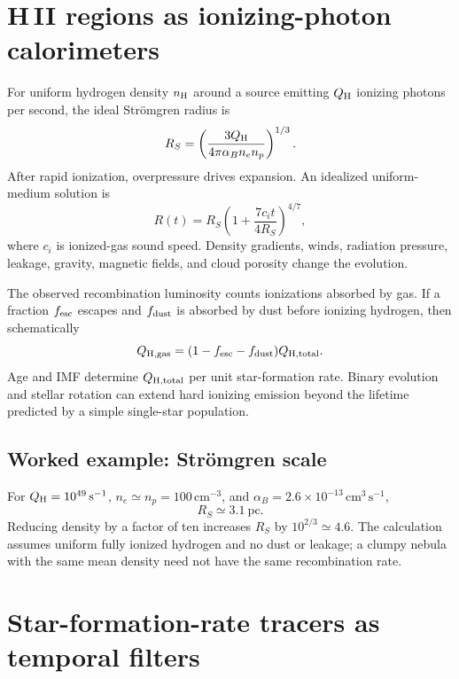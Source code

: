 \section{\texorpdfstring{H\,II}{H II} regions as ionizing-photon calorimeters}

For uniform hydrogen density $n_{\rm H}$ around a source emitting $Q_{\rm H}$ ionizing
photons per second, the ideal Str\"omgren radius is
\begin{equation}
 R_S=\left(\frac{3Q_{\rm H}}{4\pi\alpha_Bn_e n_p}\right)^{1/3}.
 \label{eq:stromgren-radius}
\end{equation}
After rapid ionization, overpressure drives expansion.  An idealized uniform-medium
solution is
\begin{equation}
 R(t)=R_S\left(1+\frac{7c_it}{4R_S}\right)^{4/7},
 \label{eq:hii-spitzer-expansion}
\end{equation}
where $c_i$ is ionized-gas sound speed.  Density gradients, winds, radiation pressure,
leakage, gravity, magnetic fields, and cloud porosity change the evolution.

The observed recombination luminosity counts ionizations absorbed by gas.  If a
fraction $f_{\rm esc}$ escapes and $f_{\rm dust}$ is absorbed by dust before ionizing
hydrogen, then schematically
\begin{equation}
 Q_{\rm H,gas}=(1-f_{\rm esc}-f_{\rm dust})Q_{\rm H,total}.
 \label{eq:ionizing-photon-budget}
\end{equation}
Age and IMF determine $Q_{\rm H,total}$ per unit star-formation rate.  Binary evolution
and stellar rotation can extend hard ionizing emission beyond the lifetime predicted
by a simple single-star population.

\subsection{Worked example: Str\"omgren scale}

For $Q_{\rm H}=10^{49}\,\mathrm{s^{-1}}$, $n_e\simeq n_p=100\,\mathrm{cm^{-3}}$,
and $\alpha_B=2.6\times10^{-13}\,\mathrm{cm^3\,s^{-1}}$,
\begin{equation}
 R_S\simeq3.1~\mathrm{pc}.
\end{equation}
Reducing density by a factor of ten increases $R_S$ by $10^{2/3}\simeq4.6$.
The calculation assumes uniform fully ionized hydrogen and no dust or leakage; a
clumpy nebula with the same mean density need not have the same recombination rate.

\section{Star-formation-rate tracers as temporal filters}

